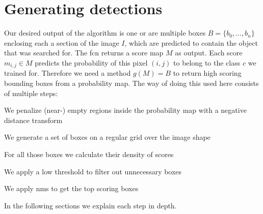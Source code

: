 \section{Generating detections}
\label{sec:pipeline:eval}
Our desired output of the algorithm is one or are multiple boxes $B=\{b_0,\dotsc,b_n\}$ enclosing each a section of the image $I$, which are predicted to contain the object that was searched for. The \gls{fcn} returns a score map $M$ as output. Each score $m_{i,j}\in M$ predicts the probability of this pixel $(i,j)$ to belong to the class $c$ we trained for. Therefore we need a method $g(M) = B$ to return high scoring bounding boxes from a probability map. The way of doing this used here consists of multiple steps:\\
\begin{my_list_num}
    \item We penalize (near-) empty regions inside the probability map with a negative distance transform
    \item We generate a set of boxes on a regular grid over the image shape
    \item For all those boxes we calculate their density of scores
    \item We apply a low threshold to filter out unnecessary boxes
    \item We apply \gls{nms} to get the top scoring boxes
\end{my_list_num}
In the following sections we explain each step in depth.


